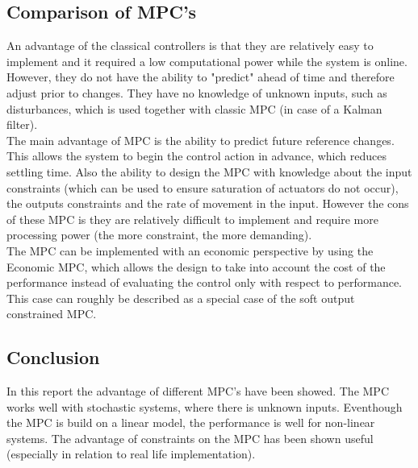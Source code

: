 \subsection{Comparison of MPC's}
An advantage of the classical controllers is that they are relatively easy to implement and it required a low computational power while the system is online. However, they do not have the ability to "predict" ahead of time and therefore adjust prior to changes. They have no knowledge of unknown inputs, such as disturbances, which is used together with classic MPC (in case of a Kalman filter). \\
The main advantage of MPC is the ability to predict future reference changes. This allows the system to begin the control action in advance, which reduces settling time. Also the ability to design the MPC with knowledge about the input constraints (which can be used to ensure saturation of actuators do not occur), the outputs constraints and the rate of movement in the input.  However the cons of these MPC is they are relatively difficult to implement and require more processing power (the more constraint, the more demanding).\\
The MPC can be implemented with an economic perspective by using the Economic MPC, which allows the design to take into account the cost of the performance instead of evaluating the control only with respect to performance. This case can roughly be described as a special case of the soft output constrained MPC.
\subsection{Conclusion}
In this report the advantage of different MPC's have been showed. The MPC works well with stochastic systems, where there is unknown inputs. Eventhough the MPC is build on a linear model, the performance is well for non-linear systems. The advantage of constraints on the MPC has been shown useful (especially in relation to real life implementation). 
